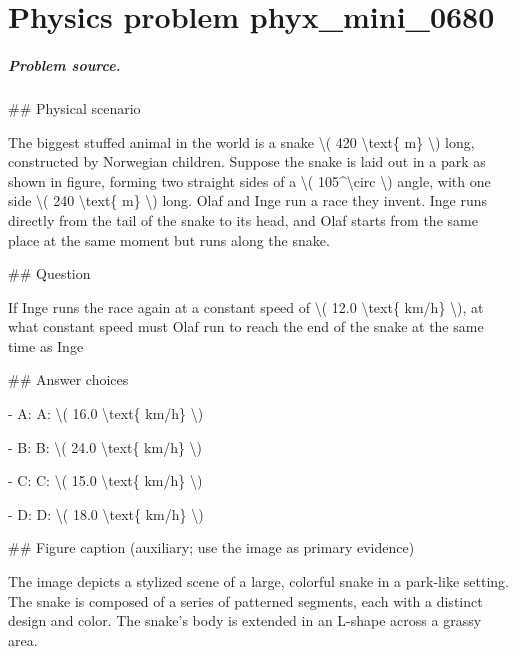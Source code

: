 
\chapter{Physics problem phyx\_mini\_0680}
\label{ch:PhyXMiniProblems_problem_phyx_mini_0680}

\paragraph{Problem source.}
\#\# Physical scenario

The biggest stuffed animal in the world is a snake \textbackslash{}( 420 \textbackslash{}text\{ m\} \textbackslash{}) long, constructed by Norwegian children. Suppose the snake is laid out in a park as shown in figure, forming two straight sides of a \textbackslash{}( 105\textasciicircum{}\textbackslash{}circ \textbackslash{}) angle, with one side \textbackslash{}( 240 \textbackslash{}text\{ m\} \textbackslash{}) long. Olaf and Inge run a race they invent. Inge runs directly from the tail of the snake to its head, and Olaf starts from the same place at the same moment but runs along the snake.

\#\# Question

If Inge runs the race again at a constant speed of \textbackslash{}( 12.0 \textbackslash{}text\{ km/h\} \textbackslash{}), at what constant speed must Olaf run to reach the end of the snake at the same time as Inge

\#\# Answer choices

- A: A: \textbackslash{}( 16.0 \textbackslash{}text\{ km/h\} \textbackslash{})

- B: B: \textbackslash{}( 24.0 \textbackslash{}text\{ km/h\} \textbackslash{})

- C: C: \textbackslash{}( 15.0 \textbackslash{}text\{ km/h\} \textbackslash{})

- D: D: \textbackslash{}( 18.0 \textbackslash{}text\{ km/h\} \textbackslash{})

\#\# Figure caption (auxiliary; use the image as primary evidence)

The image depicts a stylized scene of a large, colorful snake in a park-like setting. The snake is composed of a series of patterned segments, each with a distinct design and color. The snake's body is extended in an L-shape across a grassy area.

